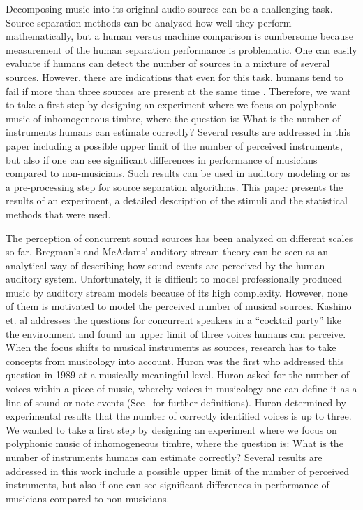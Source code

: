 Decomposing music into its original audio sources can be a challenging task. Source separation methods can be analyzed how well they perform mathematically, but a human versus machine comparison is cumbersome because measurement of the human separation performance is problematic. One can easily evaluate if humans can detect the number of sources in a mixture of several sources. However, there are indications that even for this task, humans tend to fail if more than three sources are present at the same time \cite{huron89}. Therefore, we want to take a first step by designing an experiment where we focus on polyphonic music of inhomogeneous timbre, where the question is: What is the number of instruments humans can estimate correctly? Several results are addressed in this paper including a possible upper limit of the number of perceived instruments, but also if one can see significant differences in performance of musicians compared to non-musicians. Such results can be used in auditory modeling or as a pre-processing step for source separation algorithms.
This paper presents the results of an experiment, a detailed description of the stimuli and the statistical methods that were used.
\par
The perception of concurrent sound sources has been analyzed on different scales so far. Bregman's and McAdams' \cite{mcadams79} auditory stream theory can be seen as an analytical way of describing how sound events are perceived by the human auditory system. Unfortunately, it is difficult to model professionally produced music by auditory stream models because of its high complexity.
However, none of them is motivated to model the perceived number of musical sources. Kashino et. al \cite{kashino1995} addresses the questions for concurrent speakers in a ``cocktail party'' like the environment and found an upper limit of three voices humans can perceive. When the focus shifts to musical instruments as sources, research has to take concepts from musicology into account. Huron \cite{huron89} was the first who addressed this question in 1989 at a musically meaningful level. Huron asked for the number of voices within a piece of music, whereby voices in musicology one can define it as a line of sound or note events (See~\cite{Cambouropoulos2008} for further definitions). Huron determined by experimental results that the number of correctly identified voices is up to three.
We wanted to take a first step by designing an experiment where we focus on polyphonic music of inhomogeneous timbre, where the question is: What is the number of instruments humans can estimate correctly?
Several results are addressed in this work include a possible upper limit of the number of perceived instruments, but also if one can see significant differences in performance of musicians compared to non-musicians.

